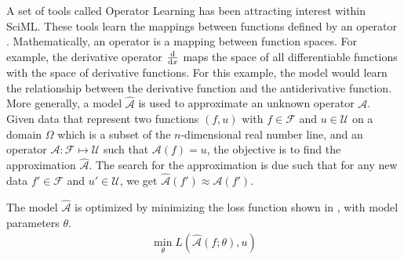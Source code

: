 A set of tools called Operator Learning has been attracting interest within SciML\@. These tools learn the mappings between functions defined by an operator \autocite{JMLR:v24:21-1524,boulleMathematicalGuideOperator2024}. Mathematically, an operator is a mapping between function spaces. For example, the derivative operator \(\dv{x}\) maps the space of all differentiable functions with the space of derivative functions. For this example, the model would learn the relationship between the derivative function and the antiderivative function. More generally, a model \(\hat{\mathcal{A}}\) is used to approximate an unknown operator \(\mathcal{A}\). Given data that represent two functions \((f,u)\) with \(f\in\mathcal{F}\) and \(u\in\mathcal{U}\) on a domain \(\Omega{}\) which is a subset of the \(n\)-dimensional real number line, and an operator \(\mathcal{A}:\mathcal{F}\mapsto\mathcal{U}\) such that \(\mathcal{A}(f)=u\), the objective is to find the approximation \(\hat{\mathcal{A}}\). The search for the approximation is due such that for any new data \(f'\in\mathcal{F}\) and \(u'\in\mathcal{U}\), we get \(\hat{\mathcal{A}}(f')\approx\mathcal{A}(f')\).

The model \(\hat{\mathcal{A}}\) is optimized by minimizing the loss function shown in , with model parameters \(\theta{}\).
\begin{align}
  \min_{\theta} L\left(\hat{\mathcal{A}}\left(f;\theta\right),u\right)\label{eq:operator_learning_loss}
\end{align}

